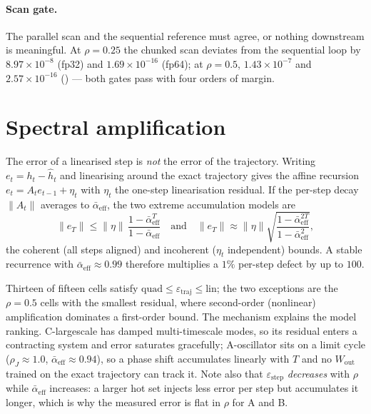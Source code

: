 \documentclass[11pt]{article}
\theoremstyle{definition}
\newcommand{\abar}{\bar{\alpha}_{\mathrm{eff}}}
\newcommand{\code}[1]{\texttt{\detokenize{#1}}}
\begin{document}
\paragraph{Scan gate.} The parallel scan and the sequential reference must agree, or nothing downstream is
meaningful. At $\rho=0.25$ the chunked scan deviates from the sequential loop by $8.97\times10^{-8}$ (fp32)
and $1.69\times10^{-16}$ (fp64); at $\rho=0.5$, $1.43\times10^{-7}$ and $2.57\times10^{-16}$
(\code{results/phase2_scan_check.json}) --- both gates pass with four orders of margin.

\section{Spectral amplification}\label{sec:amp}

The error of a linearised step is \emph{not} the error of the trajectory. Writing
$e_t = h_t - \hat h_t$ and linearising around the exact trajectory gives the affine recursion
$e_t = A_t e_{t-1} + \eta_t$ with $\eta_t$ the one-step linearisation residual. If the per-step decay
$\|A_t\|$ averages to $\abar$, the two extreme accumulation models are
\begin{equation}
\|e_T\| \le \|\eta\|\,\frac{1-\abar^{T}}{1-\abar}
\quad\text{and}\quad
\|e_T\| \approx \|\eta\|\sqrt{\frac{1-\abar^{2T}}{1-\abar^{2}}},
\label{eq:gain}
\end{equation}
the coherent (all steps aligned) and incoherent ($\eta_t$ independent) bounds. A stable recurrence with
$\abar\approx0.99$ therefore multiplies a $1\%$ per-step defect by up to $100$.

\begin{table}[tbp]
\centering
\caption{Measured amplification at the longest horizon ($T=512$ for A/B, $T=1024$ for C).
$\varepsilon_{\text{step}}$ is the per-step linearisation residual along the approximate trajectory (local) and
at the exact state (exact); $\abar$ is the mean per-step decay; the bounds are
\eqref{eq:gain}. \emph{in}/\emph{out} marks whether the measured trajectory error falls inside them.}
\label{tab:amp}


\end{table}

Thirteen of fifteen cells satisfy
$\text{quad}\le\varepsilon_{\text{traj}}\le\text{lin}$; the two exceptions are the $\rho=0.5$ cells with the
smallest residual, where second-order (nonlinear) amplification dominates a first-order bound. The mechanism
explains the model ranking. C-largescale has damped multi-timescale modes, so its residual enters a
contracting system and error saturates gracefully; A-oscillator sits on a limit cycle
($\rho_J\approx1.0$, $\abar\approx0.94$), so a phase shift accumulates linearly with $T$ and no
$W_{\text{out}}$ trained on the exact trajectory can track it. Note also that $\varepsilon_{\text{step}}$
\emph{decreases} with $\rho$ while $\abar$ increases: a larger hot set injects less error per step but
accumulates it longer, which is why the measured error is flat in $\rho$ for A and B.
\end{document}
